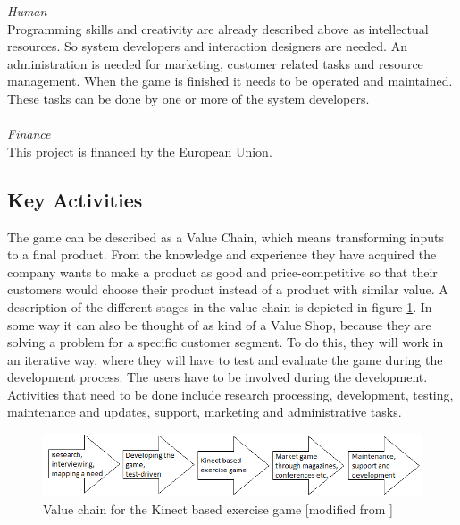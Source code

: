 \emph{Human} \\ Programming skills and creativity are already described above as intellectual resources. So system developers and interaction designers are needed. An administration is needed for marketing, customer related tasks and resource management. When the game is finished it needs to be operated and maintained. These tasks can be done by one or more of the system developers. \\ \\
\emph{Finance} \\ This project is financed by the European Union. 
\subsection{Key Activities}
The game can be described as a Value Chain, which means transforming inputs to a final product. From the knowledge and experience they have acquired the company wants to make a product as good and price-competitive so that their customers would choose their product instead of a product with similar value. A description of the different stages in the value chain is depicted in figure \ref{fig:ValueChainCase}. In some way it can also be thought of as kind of a Value Shop, because they are solving a problem for a specific customer segment. To do this, they will work in an iterative way, where they will have to test and evaluate the game during the development process. The users have to be involved during the development. 
Activities that need to be done include research processing, development, testing, maintenance and updates, support, marketing and administrative tasks. 

\begin{figure}
\label{fig:ValueChainCase}
\begin{center}
\includegraphics[scale=0.7]{valuechaincase}
\caption[Value Chain for the Kinect Based Exercise Game]{Value chain for the Kinect based exercise game [modified from \cite{osterwalderthesis}]}
\end{center}
\end{figure}
\newpage


